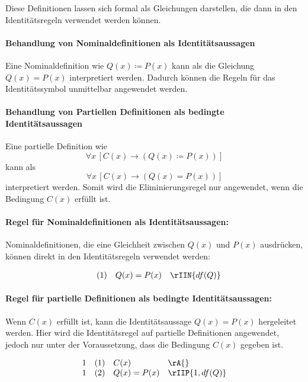 \documentclass{book}
\theoremstyle{plain}
\theoremstyle{remark}
\theoremstyle{definition}
\begin{document}
Diese Definitionen lassen sich formal als Gleichungen darstellen, die dann in den Identitätsregeln verwendet werden können.

\paragraph{Behandlung von Nominaldefinitionen als Identitätsaussagen}


Eine Nominaldefinition wie \( Q(x) \coloneqq P(x) \) kann als die Gleichung \( Q(x) = P(x) \) interpretiert werden. Dadurch können die Regeln für das Identitätssymbol unmittelbar angewendet werden.

\paragraph{Behandlung von Partiellen Definitionen als bedingte Identitätsaussagen}

Eine partielle Definition wie 
\[
\forall x \, [ C(x) \rightarrow ( Q(x) \coloneqq P(x) ) ]
\]
kann als
\[
\forall x \, [ C(x) \rightarrow ( Q(x) = P(x) ) ]
\]
interpretiert werden. Somit wird die Eliminierungsregel nur angewendet, wenn die Bedingung \( C(x) \) erfüllt ist.

\paragraph{Regel für Nominaldefinitionen als Identitätsaussagen:}
\label{rule:IIN}

Nominaldefinitionen, die eine Gleichheit zwischen \(Q(x)\) und \(P(x)\) ausdrücken, können direkt in den Identitätsregeln verwendet werden:

\[
\begin{array}{llll}
	  & (1) & Q(x) = P(x) & \rIIN{df(Q)} \\
\end{array}
\]

\paragraph{Regel für partielle Definitionen als bedingte Identitätsaussagen:}
\label{rule:IIP}

 Wenn \(C(x)\) erfüllt ist, kann die Identitätsaussage \(Q(x) = P(x)\) hergeleitet werden. Hier wird die Identitätsregel auf partielle Definitionen angewendet, jedoch nur unter der Voraussetzung, dass die Bedingung \(C(x)\) gegeben ist.

\[
\begin{array}{llll}
	1 & (1) & C(x) & \rA{} \\
	1 & (2) & Q(x)=P(x) & \rIIP{1,df(Q)} \\
\end{array}
\]
\end{document}

